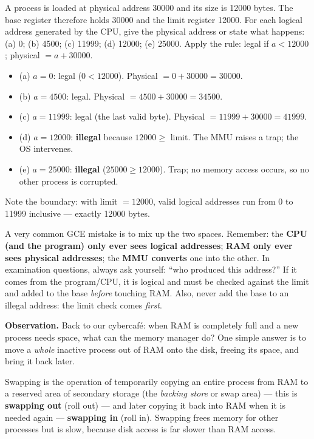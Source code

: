 \documentclass[11pt]{article}
\newcommand{\cle}[1]{{\popxbold\color{popdark}#1}}
\newcounter{popsec}
\newcounter{popsub}
\newcommand{\courssub}[1]{%
  \stepcounter{popsub}%
  \par\vspace{9pt}\noindent{\popxbold\fontsize{11.5}{13}\selectfont\color{popink}{\color{poporange}\thepopsec.\thepopsub}\hspace{6pt}#1}\par\nopagebreak\vspace{4pt}
}
\begin{document}
\begin{exoresolu}
A process is loaded at physical address 30000 and its size is 12000 bytes. The base register therefore holds 30000 and the limit register 12000. For each logical address generated by the CPU, give the physical address or state what happens: (a) 0; (b) 4500; (c) 11999; (d) 12000; (e) 25000.
\tcblower
Apply the rule: legal if $a < 12000$; physical $= a + 30000$.
\begin{itemize}
\item (a) $a = 0$: legal ($0 < 12000$). Physical $= 0 + 30000 = 30000$.
\item (b) $a = 4500$: legal. Physical $= 4500 + 30000 = 34500$.
\item (c) $a = 11999$: legal (the last valid byte). Physical $= 11999 + 30000 = 41999$.
\item (d) $a = 12000$: \textbf{illegal} because $12000 \ge$ limit. The MMU raises a trap; the OS intervenes.
\item (e) $a = 25000$: \textbf{illegal} ($25000 \ge 12000$). Trap; no memory access occurs, so no other process is corrupted.
\end{itemize}
Note the boundary: with limit $= 12000$, valid logical addresses run from 0 to 11999 inclusive --- exactly 12000 bytes.
\end{exoresolu}

\begin{attention}
A very common GCE mistake is to mix up the two spaces. Remember: the \textbf{CPU (and the program) only ever sees logical addresses}; \textbf{RAM only ever sees physical addresses}; the \textbf{MMU converts} one into the other. In examination questions, always ask yourself: ``who produced this address?'' If it comes from the program/CPU, it is logical and must be checked against the limit and added to the base \emph{before} touching RAM. Also, never add the base to an illegal address: the limit check comes \emph{first}.
\end{attention}

\courssub{Swapping}

\textbf{Observation.} Back to our cybercafé: when RAM is completely full and a new process needs space, what can the memory manager do? One simple answer is to move a \emph{whole} inactive process out of RAM onto the disk, freeing its space, and bring it back later.

\begin{definition}[Swapping]
\cle{Swapping} is the operation of temporarily copying an entire process from RAM to a reserved area of secondary storage (the \emph{backing store} or swap area) --- this is \textbf{swapping out} (roll out) --- and later copying it back into RAM when it is needed again --- \textbf{swapping in} (roll in). Swapping frees memory for other processes but is slow, because disk access is far slower than RAM access.
\end{definition}
\end{document}
